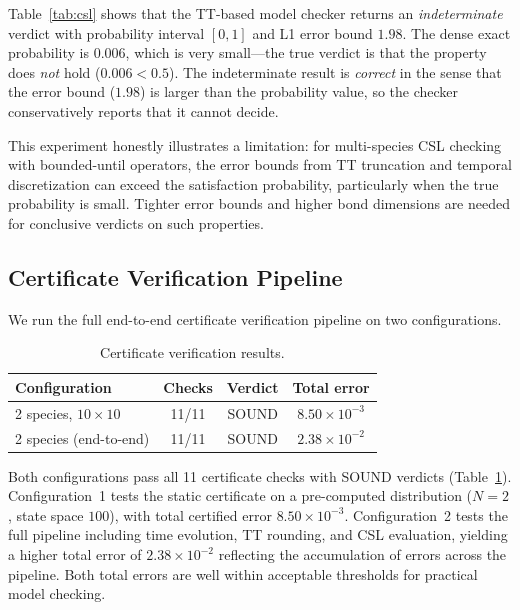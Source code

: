 \documentclass[11pt]{article}
\begin{document}
Table~\ref{tab:csl} shows that the TT-based model checker returns an
\emph{indeterminate} verdict with probability interval $[0, 1]$
and L1 error bound $1.98$.
The dense exact probability is $0.006$, which is very small---the
true verdict is that the property does \emph{not} hold
($0.006 < 0.5$).
The indeterminate result is \emph{correct} in the sense that the
error bound ($1.98$) is larger than the probability value, so the
checker conservatively reports that it cannot decide.

This experiment honestly illustrates a limitation: for multi-species
CSL checking with bounded-until operators, the error bounds from
TT truncation and temporal discretization can exceed the satisfaction
probability, particularly when the true probability is small.
Tighter error bounds and higher bond dimensions are needed for
conclusive verdicts on such properties.

\subsection{Certificate Verification Pipeline}\label{sec:exp:cert}

We run the full end-to-end certificate verification pipeline on
two configurations.

\begin{table}[t]
\centering
\caption{Certificate verification results.}
\label{tab:cert}
\begin{tabular}{lccc}
\toprule
\textbf{Configuration} & \textbf{Checks} & \textbf{Verdict} & \textbf{Total error} \\
\midrule
2 species, $10\times 10$ & 11/11 & SOUND & $8.50\times 10^{-3}$ \\
2 species (end-to-end) & 11/11 & SOUND & $2.38\times 10^{-2}$ \\
\bottomrule
\end{tabular}
\end{table}

Both configurations pass all 11 certificate checks with SOUND verdicts
(Table~\ref{tab:cert}).
Configuration~1 tests the static certificate on a pre-computed
distribution ($N=2$, state space $100$), with total certified error
$8.50\times 10^{-3}$.
Configuration~2 tests the full pipeline including time evolution,
TT rounding, and CSL evaluation, yielding a higher total error of
$2.38\times 10^{-2}$ reflecting the accumulation of errors across
the pipeline.
Both total errors are well within acceptable thresholds for practical
model checking.
\end{document}
